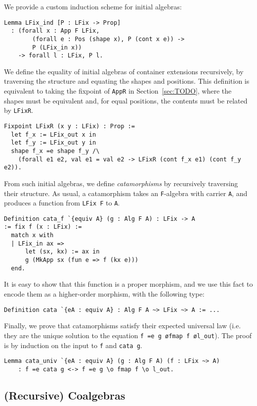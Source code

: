 \documentclass[a4paper, UKenglish, cleveref, autoref, thm-restate]{lipics-v2021}
\begin{document}
We provide a custom induction scheme for initial algebras:
\begin{verbatim}
Lemma LFix_ind [P : LFix -> Prop]
  : (forall x : App F LFix,
        (forall e : Pos (shape x), P (cont x e)) ->
        P (LFix_in x))
    -> forall l : LFix, P l.
\end{verbatim}
We define the equality of initial algebras of container extensions recursively,
by traversing the structure and equating the shapes and positions. This
definition is equivalent to taking the fixpoint of \texttt{AppR} in
Section~\ref{sec:TODO}, where the shapes must be equivalent and, for equal
positions, the contents must be related by \texttt{LFixR}.
\begin{verbatim}
Fixpoint LFixR (x y : LFix) : Prop :=
  let f_x := LFix_out x in
  let f_y := LFix_out y in
  shape f_x =e shape f_y /\
    (forall e1 e2, val e1 = val e2 -> LFixR (cont f_x e1) (cont f_y e2)).
\end{verbatim}
From such initial algebras, we define \emph{catamorphisms} by recursively
traversing their structure. As usual, a catamorphism takes an
\texttt{F}-algebra with carrier \texttt{A}, and produces a
function from \texttt{LFix F} to \texttt{A}.
\begin{verbatim}
Definition cata_f `{equiv A} (g : Alg F A) : LFix -> A
:= fix f (x : LFix) :=
  match x with
  | LFix_in ax =>
      let (sx, kx) := ax in
      g (MkApp sx (fun e => f (kx e)))
  end.
\end{verbatim}
It is easy to show that this function is a proper morphism, and we use this
fact to encode them as a higher-order morphism, with the following type:
\begin{verbatim}
Definition cata `{eA : equiv A} : Alg F A ~> LFix ~> A := ...
\end{verbatim}
Finally, we prove that catamorphisms satisfy their expected universal law (i.e.
they are the unique solution to the equation \texttt{f =e g \o fmap f \o l_out}).
The proof is by induction on the input to \texttt{f} and
\texttt{cata g}.
\begin{verbatim}
Lemma cata_univ `{eA : equiv A} (g : Alg F A) (f : LFix ~> A)
    : f =e cata g <-> f =e g \o fmap f \o l_out.
\end{verbatim}

\subsection{(Recursive) Coalgebras}
\end{document}
